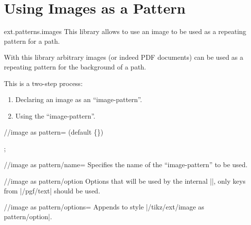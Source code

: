 %
%
%
\clearpage
\section{Using Images as a Pattern}
\label{library:patterns.images}

\begin{tikzlibrary}{ext.patterns.images}
  This library allows to use an image to be used as a repeating pattern for a path.
  
\end{tikzlibrary}

With this library arbitrary images (or indeed PDF documents) can be used as
a repeating pattern for the background of a path.

This is a two-step process:
\begin{enumerate}
\item Declaring an image as an ``image-pattern''.
\item Using the ``image-pattern''.
\end{enumerate}

\begin{command}{\tikzextsetupimageaspattern{}}\cmdcompat{\pgfsetupimageaspattern}
\end{command}

\begin{key}{/\tikzext/image as pattern= (default \{\})}

\begin{codeexample}[preamble=\usetikzlibrary{ext.patterns.images,shapes.geometric}]
\tikz \node[star, minimum size=3cm, draw,
  ext/image as pattern={name=grid, options={left, bottom, y=-.5cm, rotate=45}}] {};
\end{codeexample}
\end{key}

\begin{key}{/\tikzext/image as pattern/name=}
Specifies the name of the ``image-pattern'' to be used.
\end{key}

\begin{stylekey}{/\tikzext/image as pattern/option}
Options that will be used by the internal |\pgftext|,\indexCommandO{\pgftext}
only keys from |/pgf/text| should be used.
\end{stylekey}

\begin{key}{/\tikzext/image as pattern/options=}
Appends to style |/tikz/ext/image as pattern/option|.
\end{key}